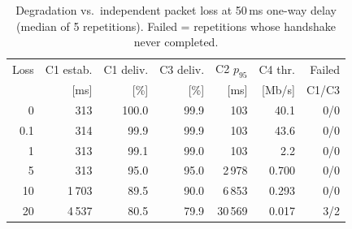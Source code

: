\begin{table}[t]
\centering
\caption{Degradation vs.\ independent packet loss at 50\,ms one-way delay (median of 5 repetitions). Failed = repetitions whose handshake never completed.}
\label{tab:loss}
\begin{tabular}{rrrrrrr}
\toprule
Loss & C1 estab. & C1 deliv. & C3 deliv. & C2 $p_{95}$ & C4 thr. & Failed \\
[\%] & [ms] & [\%] & [\%] & [ms] & [Mb/s] & C1/C3 \\
\midrule
0 & 313 & 100.0 & 99.9 & 103 & 40.1 & 0/0 \\
0.1 & 314 & 99.9 & 99.9 & 103 & 43.6 & 0/0 \\
1 & 313 & 99.1 & 99.0 & 103 & 2.2 & 0/0 \\
5 & 313 & 95.0 & 95.0 & 2\,978 & 0.700 & 0/0 \\
10 & 1\,703 & 89.5 & 90.0 & 6\,853 & 0.293 & 0/0 \\
20 & 4\,537 & 80.5 & 79.9 & 30\,569 & 0.017 & 3/2 \\
\bottomrule
\end{tabular}
\end{table}
